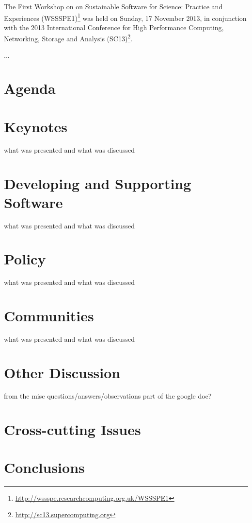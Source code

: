 \documentclass[11pt, oneside]{amsart}
\begin{document}
The First Workshop on on Sustainable Software for Science: Practice and Experiences (WSSSPE1)\footnote{\url{http://wssspe.researchcomputing.org.uk/WSSSPE1}} was held on Sunday, 17 November 2013, in conjunction with the 2013 International Conference for High Performance Computing, Networking, Storage and Analysis (SC13)\footnote{\url{http://sc13.supercomputing.org}}.

...

\section{Agenda}

\section{Keynotes}

what was presented and what was discussed

\section{Developing and Supporting Software}

what was presented and what was discussed

\section{Policy}

what was presented and what was discussed

\section{Communities}

what was presented and what was discussed

\section{Other Discussion}

from the misc questions/answers/observations part of the google doc?

\section{Cross-cutting Issues}

\section{Conclusions}
\end{document}
